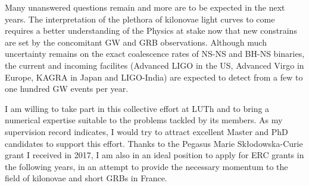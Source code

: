 \documentclass[12pt,onecolumn]{article}
\makeatletter
\newcommand{\gw}{GW\xspace}
\newcommand{\grb}{GRB\xspace}
\newcommand{\grbs}{GRBs\xspace}
\newcommand*{\ns}{NS\@\xspace}
\newcommand*{\bh}{BH\@\xspace}
\makeatother
\begin{document}
Many unanswered questions remain and more are to be expected in the next years. The interpretation of the plethora of kilonovae light curves to come requires a better understanding of the Physics at stake now that new constrains are set by the concomitant \gw and \grb observations. Although much uncertainty remains on the exact coalescence rates of \ns-\ns and \bh-\ns binaries, the current and incoming facilites (Advanced LIGO in the US, Advanced Virgo in Europe, KAGRA in Japan and LIGO-India) are expected to detect from a few to one hundred \gw events per year. 

I am willing to take part in this collective effort at LUTh and to bring a numerical expertise suitable to the problems tackled by its members. As my supervision record indicates, I would try to attract excellent Master and PhD candidates to support this effort. Thanks to the Pegasus Marie Sk\l{}odowska-Curie grant I received in 2017, I am also in an ideal position to apply for ERC grants in the following years, in an attempt to provide the necessary momentum to the field of kilonovae and short \grbs in France.




\vspace*{0.6cm}
\setlength\bibitemsep{0pt}
%
%

%
\printbibliography[heading=none,title={},omitnumbers=true]
\end{document}
